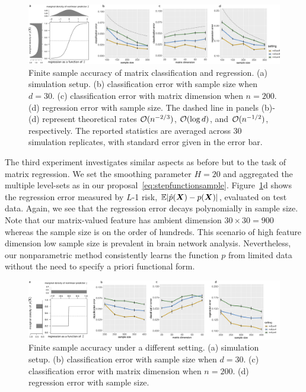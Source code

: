 \documentclass[11pt]{article}
\theoremstyle{plain}
\theoremstyle{definition}
\begin{document}
\begin{figure}[ht]
    \centering
    \includegraphics[width=\textwidth]{combined_logistic.pdf}
    \caption{Finite sample accuracy of matrix classification and regression. (a) simulation setup. (b) classification error with sample size when $d=30$. (c) classification error with matrix dimension when $n=200$. (d) regression error with sample size. The dashed line in panels (b)-(d) represent theoretical rates $\mathcal{O}(n^{-2/3})$, $\mathcal{O}(\log d)$, and $\mathcal{O}(n^{-1/2})$, respectively. The reported statistics are averaged across 30 simulation replicates, with standard error given in the error bar.}\label{fig:logistic}
\end{figure}

The third experiment investigates similar aspects as before but to the task of matrix regression. We set the smoothing parameter $H=20$ and aggregated the multiple level-sets as in our proposal~\eqref{eq:stepfunctionsample}. Figure~\ref{fig:logistic}d shows the regression error measured by $L$-1 risk, $\mathbb{E}|\hat p (\bm X)- p(\bm X)|$, evaluated on test data. Again, we see that the regression error decays polynomially in sample size. Note that our matrix-valued feature has ambient dimension $30\times 30=900$ whereas the sample size is on the order of hundreds. This scenario of high feature dimension low sample size is prevalent in brain network analysis. Nevertheless, our nonparametric method consistently learns the function $p$ from limited data without the need to specify a priori functional form.

\begin{figure}[ht]
    \centering
    \includegraphics[width=\textwidth]{combined_steps.pdf}
    \caption{Finite sample accuracy under a different setting. (a) simulation setup. (b) classification error with sample size when $d=30$. (c) classification error with matrix dimension when $n=200$. (d) regression error with sample size. }\label{fig:step}
\end{figure}
\end{document}
